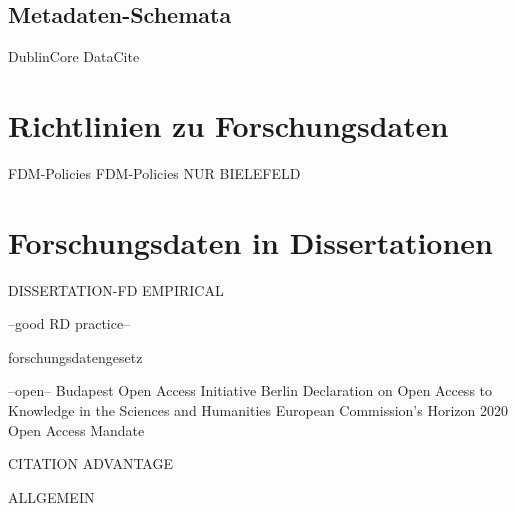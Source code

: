 \subsection{Metadaten-Schemata}\label{sec:forschungsstand-basics-metadata}
DublinCore DataCite \autocite{datacite}


\section{Richtlinien zu Forschungsdaten}\label{sec:forschungsstand-guidelines}
FDM-Policies \autocite{Briney2015-Policy,Hiemenz2018-fdm-report,Hiemenz2018-fdm-title}
FDM-Policies NUR BIELEFELD \autocite{hrk-fdm}



\section{Forschungsdaten in Dissertationen}\label{sec:forschungsstand-diss}
DISSERTATION-FD EMPIRICAL \autocite{Campbell2019}
\autocite{Weisbrod2017eDissPlus,Weisbrod2018,dnb2017}
\autocite{Wünsche2018Forschungsdaten}
\autocite{Schöpfel2015}




--good RD practice--


forschungsdatengesetz 

--open--
Budapest Open Access Initiative
Berlin Declaration on Open Access to Knowledge in the Sciences and Humanities
European Commission's Horizon 2020 Open Access Mandate







CITATION ADVANTAGE \autocite{Bautista-Puig2020}

ALLGEMEIN \autocite{Hopf2022}






\autocite{Martin2013Wissenschaftliche,TenopirEtAl2017,Tröger2016,}



